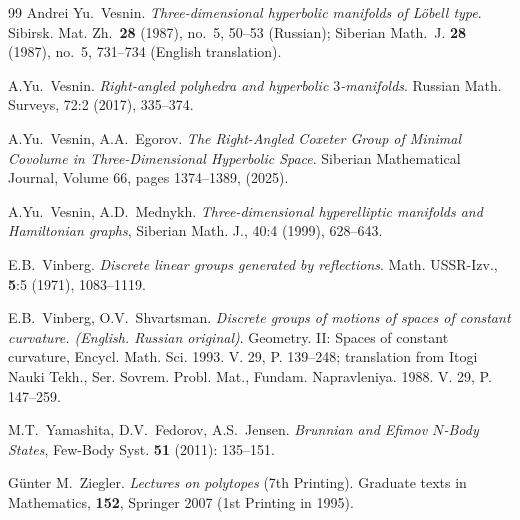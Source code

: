 \documentclass[12pt]{amsart}
\theoremstyle{definition}
\theoremstyle{remark}
\begin{document}
\begin{thebibliography}{99}
Andrei Yu.~Vesnin.  
\emph{Three-dimensional hyperbolic manifolds of L\"obell type}. 
Sibirsk. Mat. Zh.~{\bf 28} (1987), no.~5, 50--53 (Russian); 
Siberian Math.~J. {\bf 28} (1987), no.~5, 731--734 (English translation).

A.Yu.~Vesnin.
\emph{Right-angled polyhedra and hyperbolic $3$-manifolds}.
Russian Math. Surveys, 72:2 (2017), 335--374.

A.Yu.~Vesnin, A.A.~Egorov.
\emph{The Right-Angled Coxeter Group of Minimal Covolume in Three-Dimensional Hyperbolic Space}. 
Siberian Mathematical Journal, Volume 66, pages 1374--1389, (2025).

A.Yu.~Vesnin, A.D.~Mednykh.
\emph{Three-dimensional hyperelliptic manifolds and Hamiltonian graphs}, 
Siberian Math. J., 40:4 (1999), 628--643.

E.B.~Vinberg.
\emph{Discrete linear groups generated by reflections}.
Math. USSR-Izv., {\bf 5}:5 (1971), 1083--1119.

E.B.~Vinberg, O.V.~Shvartsman.
\emph{Discrete groups of motions of spaces of constant curvature. (English. Russian original)}. 
Geometry. II: Spaces of constant curvature, Encycl. Math. Sci. 1993. V. 29, P. 139--248; translation from 
Itogi Nauki Tekh., Ser. Sovrem. Probl. Mat., Fundam. Napravleniya. 1988. V. 29, P. 147--259.

M.T.~Yamashita, D.V.~Fedorov, A.S.~Jensen.
\emph{Brunnian and Efimov $N$-Body States},
Few-Body Syst.  {\bf 51} (2011): 135--151.

G\"unter M.~Ziegler. 
\emph{Lectures on polytopes} (7th Printing).  
Graduate texts in Mathematics, {\bf 152}, Springer 2007 (1st Printing in 1995).
\end{thebibliography}
\end{document}
